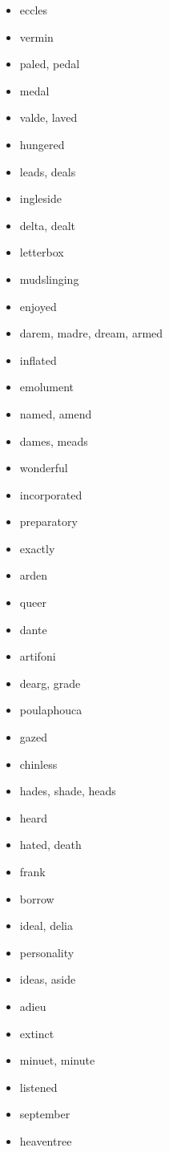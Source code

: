 \documentclass{article}
\begin{document}
\begin{itemize}
    \item eccles
    \item vermin
    \item paled, pedal
    \item medal
    \item valde, laved
    \item hungered
    \item leads, deals
    \item ingleside
    \item delta, dealt
    \item letterbox
    \item mudslinging
    \item enjoyed
    \item darem, madre, dream, armed
    \item inflated
    \item emolument
    \item named, amend
    \item dames, meads
    \item wonderful
    \item incorporated
    \item preparatory
    \item exactly
    \item arden
    \item queer
    \item dante
    \item artifoni
    \item dearg, grade
    \item poulaphouca
    \item gazed
    \item chinless
    \item hades, shade, heads
    \item heard
    \item hated, death
    \item frank
    \item borrow
    \item ideal, delia
    \item personality
    \item ideas, aside
    \item adieu
    \item extinct
    \item minuet, minute
    \item listened
    \item september
    \item heaventree

\end{itemize}
\end{document}
